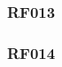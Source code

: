 %
%
%
%
%

\subsubsection{RF013}
\label{subs:RF013}

%
%
%

\subsubsection{RF014}
\label{subs:RF014}

